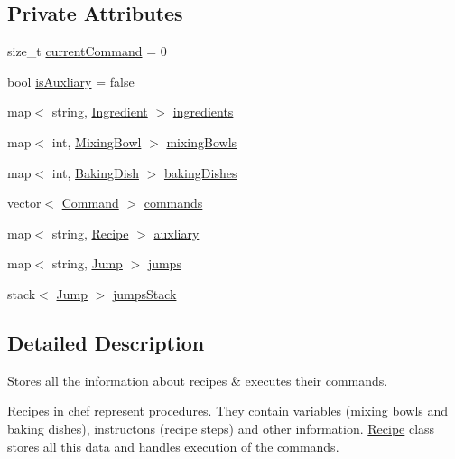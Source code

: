 \subsection*{Private Attributes}
\begin{DoxyCompactItemize}
\item 
size\-\_\-t \hyperlink{classRecipe_ab29f1a07d6c30a5c7b4da4ab53822c49}{current\-Command} = 0
\item 
bool \hyperlink{classRecipe_a3edfc934ad30f52f01dc90630b0decaa}{is\-Auxliary} = false
\item 
map$<$ string, \hyperlink{classIngredient}{Ingredient} $>$ \hyperlink{classRecipe_a9cf0fa9aedac7925a49a5655401a2680}{ingredients}
\item 
map$<$ int, \hyperlink{classMixingBowl}{Mixing\-Bowl} $>$ \hyperlink{classRecipe_ad21a1bda0d75378dd9b53c1abb76524f}{mixing\-Bowls}
\item 
map$<$ int, \hyperlink{classBakingDish}{Baking\-Dish} $>$ \hyperlink{classRecipe_aae370ab1573cc3222fa5a77c9ed5cee4}{baking\-Dishes}
\item 
vector$<$ \hyperlink{structCommand}{Command} $>$ \hyperlink{classRecipe_ae1419284a891adb4ae550d6ea4c76df8}{commands}
\item 
map$<$ string, \hyperlink{classRecipe}{Recipe} $>$ \hyperlink{classRecipe_af7f123d033d11cc87b2113c7a208cd83}{auxliary}
\item 
map$<$ string, \hyperlink{structJump}{Jump} $>$ \hyperlink{classRecipe_a0e57db5b119a8dcc06cfd79a0d1857ed}{jumps}
\item 
stack$<$ \hyperlink{structJump}{Jump} $>$ \hyperlink{classRecipe_a66460d610a0717995788284a3d4c4ba5}{jumps\-Stack}
\end{DoxyCompactItemize}


\subsection{Detailed Description}
Stores all the information about recipes \& executes their commands. 

Recipes in chef represent procedures. They contain variables (mixing bowls and baking dishes), instructons (recipe steps) and other information. \hyperlink{classRecipe}{Recipe} class stores all this data and handles execution of the commands. 


